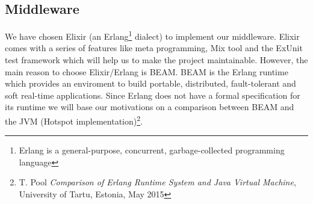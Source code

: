 \subsection{Middleware}
We have chosen Elixir (an Erlang\footnote{Erlang is a general-purpose, 
concurrent, garbage-collected programming language} dialect) to implement 
our middleware. Elixir comes with a series of features like meta programming, 
Mix tool and the ExUnit test framework which will help us to make 
the project maintainable.
However, the main reason to choose Elixir/Erlang is BEAM.
BEAM is the Erlang runtime which provides an enviroment to build portable, 
distributed, fault-tolerant and soft real-time applications.
Since Erlang does not have a formal specification for its runtime we will
 base our motivations on a comparison between BEAM and the JVM 
(Hotspot implementation)\footnote{T. Pool \textit{Comparison of Erlang Runtime 
System and Java Virtual Machine}, University of Tartu, Estonia, May 2015}.

